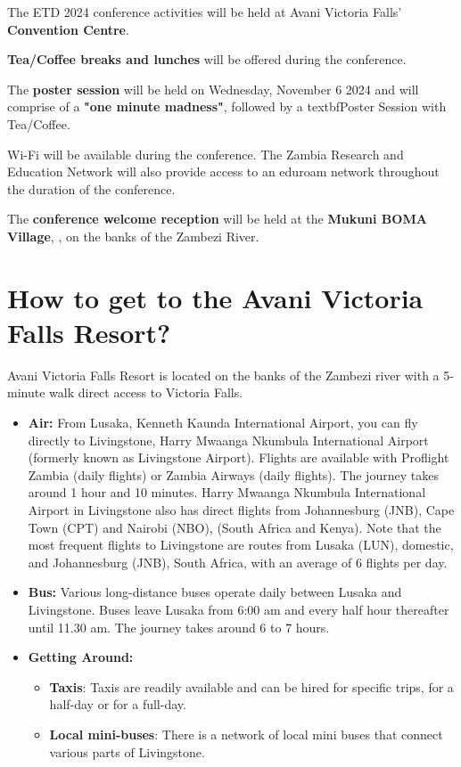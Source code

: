 The ETD 2024 conference activities will be held at Avani Victoria Falls' \textbf{Convention Centre}.

\textbf{Tea/Coffee breaks and lunches} will be offered during the conference.

The \textbf{poster session} will be held on Wednesday, November 6 2024 and will comprise of a \textbf{"one minute madness"}, followed by a textbf{Poster Session with Tea/Coffee}.

Wi-Fi will be available during the conference. The Zambia Research and Education Network will also provide access to an eduroam network throughout the duration of the conference.

The \textbf{conference welcome reception} will be held at the \textbf{Mukuni BOMA Village}, , on the banks of the Zambezi River.

\section{How to get to the Avani Victoria Falls Resort?}

Avani Victoria Falls Resort is located on the banks of the Zambezi river with a 5-minute walk direct access to Victoria Falls.

\begin{itemize}

	\item \textbf{Air:} From Lusaka, Kenneth Kaunda International Airport, you can fly directly to Livingstone, Harry Mwaanga Nkumbula International Airport (formerly known as Livingstone Airport). Flights are available with Proflight Zambia (daily flights) or Zambia Airways (daily flights). The journey takes around 1 hour and 10 minutes. Harry Mwaanga Nkumbula International Airport in Livingstone also has direct flights from Johannesburg (JNB), Cape Town (CPT) and Nairobi (NBO), (South Africa and Kenya). Note that the most frequent flights to Livingstone are routes from Lusaka (LUN), domestic, and Johannesburg (JNB), South Africa, with an average of 6 flights per day.
	\item \textbf{Bus:} Various long-distance buses operate daily between Lusaka and Livingstone. Buses leave Lusaka from 6:00 am and every half hour thereafter until 11.30 am. The journey takes around 6 to 7 hours.
	\item \textbf{Getting Around:}
	\begin{itemize}
	    \item \textbf{Taxis}: Taxis are readily available and can be hired for specific trips, for a half-day or for a full-day.
        \item \textbf{Local mini-buses}: There is a network of local mini buses that connect various parts of Livingstone.
    \end{itemize}
	
\end{itemize}

